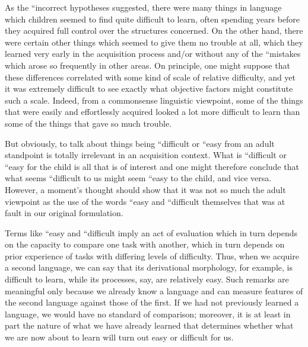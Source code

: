 As the ``incorrect hypotheses suggested, there were many things in language which children seemed to find quite difficult to learn, often spending years before they acquired full control over the structures concerned. On the other hand, there were certain other things which seemed to give them no trouble at all, which they learned very early in the acquisition process and/or without any of the ``mistakes which arose so frequently in other areas. On principle, one might suppose that these differences correlated with some kind of scale of relative difficulty, and yet it was extremely difficult to see exactly what objective factors might constitute such a scale. Indeed, from a commonsense linguistic viewpoint, some of the things that were easily and effortlessly acquired looked a lot more difficult to learn than some of the things that gave so much trouble.

But obviously, to talk about things being ``difficult or ``easy from an adult standpoint is totally irrelevant in an acquisition context. What is ``difficult or ``easy for the child is all that is of interest and one might therefore conclude that what seems ``difficult to us might seem ``easy to the child, and vice versa. However, a moment's
thought should show that it was not so much the adult viewpoint as the use of the words ``easy and ``difficult themselves that was at fault in our original formulation.

Terms like ``easy and ``difficult imply an act of evaluation which in turn depends on the capacity to compare one task with another, which in turn depends on prior experience of tasks with differing levels of difficulty. Thus, when we acquire a second language, we can say that its derivational morphology, for example, is difficult to learn, while its  processes, say, are relatively easy. Such remarks are meaningful only because we already know a language and can measure features of the second language against those of the first. If we had not previously learned a language, we would have no standard of comparison; moreover, it is at least in part the nature of what we have already learned that determines whether what we are now about to learn will turn out easy or difficult for us.

